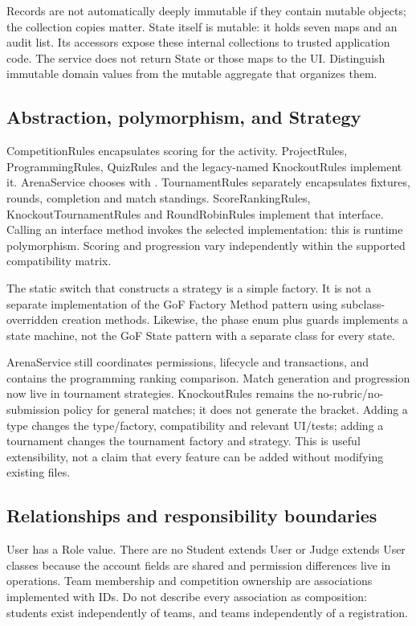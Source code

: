 \documentclass[12pt]{article}
\begin{document}
Records are not automatically deeply immutable if they contain mutable objects; the collection copies matter. State itself is mutable: it holds seven maps and an audit list. Its accessors expose these internal collections to trusted application code. The service does not return State or those maps to the UI. Distinguish immutable domain values from the mutable aggregate that organizes them.

\subsection{Abstraction, polymorphism, and Strategy}
CompetitionRules encapsulates scoring for the activity. ProjectRules, ProgrammingRules, QuizRules and the legacy-named KnockoutRules implement it. ArenaService chooses with . TournamentRules separately encapsulates fixtures, rounds, completion and match standings. ScoreRankingRules, KnockoutTournamentRules and RoundRobinRules implement that interface. Calling an interface method invokes the selected implementation: this is runtime polymorphism. Scoring and progression vary independently within the supported compatibility matrix.

The static switch that constructs a strategy is a simple factory. It is not a separate implementation of the GoF Factory Method pattern using subclass-overridden creation methods. Likewise, the phase enum plus guards implements a state machine, not the GoF State pattern with a separate class for every state.

ArenaService still coordinates permissions, lifecycle and transactions, and contains the programming ranking comparison. Match generation and progression now live in tournament strategies. KnockoutRules remains the no-rubric/no-submission policy for general matches; it does not generate the bracket. Adding a type changes the type/factory, compatibility and relevant UI/tests; adding a tournament changes the tournament factory and strategy. This is useful extensibility, not a claim that every feature can be added without modifying existing files.

\subsection{Relationships and responsibility boundaries}
User has a Role value. There are no Student extends User or Judge extends User classes because the account fields are shared and permission differences live in operations. Team membership and competition ownership are associations implemented with IDs. Do not describe every association as composition: students exist independently of teams, and teams independently of a registration.
\end{document}
